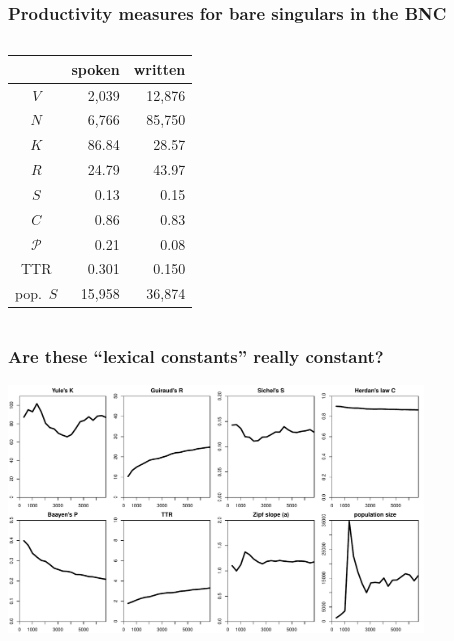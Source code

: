 \documentclass[t]{beamer} %
\begin{document}
\begin{frame}[c]
  \frametitle{Productivity measures for bare singulars in the BNC}

  \begin{columns}[c]
    \begin{column}{6cm}
      \centering
      \begin{tabular}{c@{$\qquad$}r@{$\qquad$}r}
        \toprule
        &    spoken &   written \\
        \midrule
        $V$     &  2,039 & 12,876 \\
        $N$     &  6,766 & 85,750 \\
        \midrule
        $K$     &    86.84 &    28.57 \\
        $R$     &    24.79 &    43.97 \\
        $S$     &     0.13 &     0.15 \\
        $C$     &     0.86 &     0.83 \\
        $\mathcal{P}$     &     0.21 &     0.08 \\
        TTR   &     0.301 &     0.150 \\
        pop.\ $S$ & 15,958 & 36,874 \\
        \bottomrule
      \end{tabular}
    \end{column}
    \begin{column}{6cm}
    \end{column}
  \end{columns}
\end{frame}

\begin{frame}[c]
  \frametitle{Are these ``lexical constants'' really constant?}

  \centering
  \includegraphics[width=11cm]{img/bare_bncS_obs_lexical_constants}
\end{frame}
\end{document}
